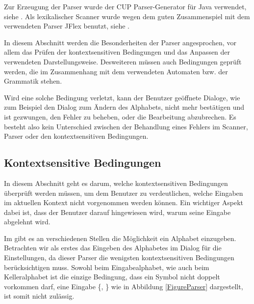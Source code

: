 Zur Erzeugung der Parser wurde der CUP Parser-Generator für Java verwendet, siehe
\cite{java-cup}. Als lexikalischer Scanner wurde wegen dem guten Zusammenspiel
mit dem verwendeten Parser JFlex benutzt, siehe \cite{jflex}.\vspace{10pt}

In diesem Abschnitt werden die Besonderheiten der Parser angesprochen, vor allem
das Prüfen der kontextsensitiven Bedingungen und das Anpassen der verwendeten
Darstellungsweise. Desweiteren müssen auch Bedingungen geprüft werden, die im
Zusammenhang mit dem verwendeten Automaten bzw. der Grammatik
stehen.\vspace{10pt}

Wird eine solche Bedingung verletzt, kann der Benutzer geöffnete Dialoge, wie zum
Beispiel den Dialog zum Ändern des Alphabets, nicht mehr bestätigen und ist
gezwungen, den Fehler zu beheben, oder die Bearbeitung abzubrechen. Es besteht
also kein Unterschied zwischen der Behandlung eines Fehlers im Scanner, Parser
oder den kontextsensitiven Bedingungen.\vspace{10pt}


\subsection{Kontextsensitive Bedingungen}\label{ParserContext}

In diesem Abschnitt geht es darum, welche kontextsensitiven Bedingungen
über\-prüft werden müssen, um dem Benutzer zu verdeutlichen, welche Eingaben im
aktuellen Kontext nicht vorgenommen werden können. Ein wichtiger Aspekt dabei
ist, dass der Benutzer darauf hingewiesen wird, warum seine Eingabe abgelehnt
wird.\vspace{10pt}

Im \gtitool gibt es an verschiedenen Stellen die Möglichkeit ein Alphabet
einzugeben. Betrachten wir als erstes das Eingeben des Alphabetes im Dialog für
die Einstellungen, da dieser Parser die wenigsten kontextsensitiven Bedingungen
berücksichtigen muss. Sowohl beim Eingabealphabet, wie auch beim Kelleralphabet
ist die einzige Bedingung, dass ein Symbol nicht doppelt vorkommen darf, eine
Eingabe \{, \} wie in Abbildung \ref{FigureParser}
dargestellt, ist somit nicht zulässig.\vspace{10pt}

